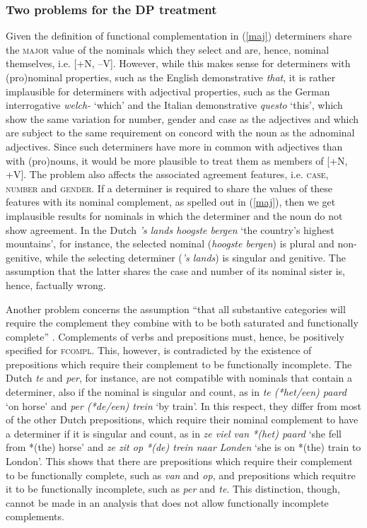 \documentclass[output=paper
                ,modfonts
                ,nonflat
	        ,collection
	        ,collectionchapter
	        ,collectiontoclongg
 	        ,biblatex
                ,babelshorthands
                ,newtxmath
                ,draftmode
                ,colorlinks, citecolor=brown
]{./langsci/langscibook}
\begin{document}
\subsubsection{Two problems for the DP treatment}  
\label{prob}


Given the definition of functional complementation in (\ref{maj})
determiners share the \textsc{major} value of the nominals which they select
and are, hence, nominal themselves, i.e. [+N, --V].
However, while this makes sense for determiners with (pro)nominal properties,
such as the English demonstrative \emph{that}, 
it is rather implausible for determiners with adjectival properties,
such as the German interrogative \emph{welch-} `which' and 
the Italian demonstrative \emph{questo} `this', which show the same variation for 
number, gender and case as the adjectives and which are subject to 
the same requirement on concord with the noun as the adnominal adjectives. 
Since such determiners have more in common with adjectives than with (pro)nouns,  
it would be more plausible to treat them as members of [+N, +V].  
The problem also affects the associated agreement features, i.e. \textsc{case}, 
\textsc{number} and \textsc{gender}. If a determiner 
is required to share the values of these features with its nominal complement,
as spelled out in (\ref{maj}), then we get implausible results for nominals in 
which the determiner and the noun do not show agreement.    
In the Dutch \emph{'s lands hoogste bergen} `the country's highest mountains', 
for instance, the selected nominal (\emph{hoogste bergen}) is plural and non-genitive, 
while the selecting determiner (\emph{'s lands}) is singular and genitive.  
The assumption that the latter shares the case and number of its nominal sister 
is, hence, factually wrong.  

Another problem concerns the assumption ``that all substantive categories will 
require the complement they combine with to be both saturated and 
functionally complete'' \citep[311]{Netter94}. Complements of verbs and 
prepositions must, hence, be positively specified for \textsc{fcompl}. 
This, however, is contradicted by the existence of 
prepositions which require their complement to be functionally incomplete.
The Dutch \emph{te} and \emph{per}, for instance, are not compatible with nominals 
that contain a determiner, also if the nominal is singular and count, 
as in \emph{te (*het/een) paard} `on horse' and \emph{per (*de/een) trein} `by train'.   
In this respect, they differ from most of the other Dutch prepositions, which 
require their nominal complement to have a determiner if it is singular and count,   
as in \emph{ze viel van *(het) paard} `she fell from *(the) horse' 
and \emph{ze zit op *(de) trein naar Londen} `she is on *(the) train to London'.  
This shows that there are prepositions which require their complement to be 
functionally complete, such as \emph{van} and \emph{op}, 
and prepositions which requitre it to be functionally incomplete, such as 
\emph{per} and \emph{te}. This distinction, though, cannot be made in 
an analysis that does not allow functionally incomplete complements. 
\end{document}
